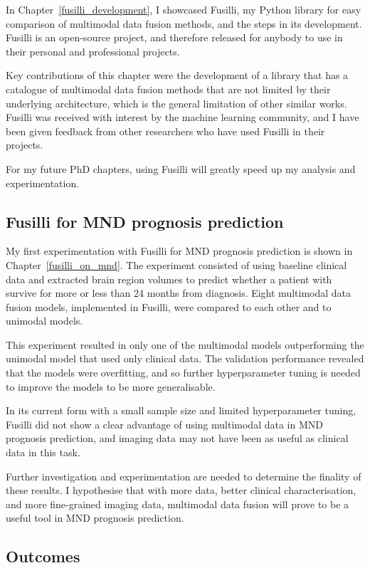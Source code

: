 In Chapter~\ref{fusilli_development}, I showcased Fusilli, my Python library for easy comparison of multimodal data fusion methods, and the steps in its development.
Fusilli is an open-source project, and therefore released for anybody to use in their personal and professional projects.

Key contributions of this chapter were the development of a library that has a catalogue of multimodal data fusion methods that are not limited by their underlying architecture, which is the general limitation of other similar works.
Fusilli was received with interest by the machine learning community, and I have been given feedback from other researchers who have used Fusilli in their projects.

For my future PhD chapters, using Fusilli will greatly speed up my analysis and experimentation.

\subsection{Fusilli for MND prognosis prediction}

My first experimentation with Fusilli for MND prognosis prediction is shown in Chapter~\ref{fusilli_on_mnd}.
The experiment consisted of using baseline clinical data and extracted brain region volumes to predict whether a patient with survive for more or less than 24 months from diagnosis.
Eight multimodal data fusion models, implemented in Fusilli, were compared to each other and to unimodal models.

This experiment resulted in only one of the multimodal models outperforming the unimodal model that used only clinical data.
The validation performance revealed that the models were overfitting, and so further hyperparameter tuning is needed to improve the models to be more generalisable.

In its current form with a small sample size and limited hyperparameter tuning, Fusilli did not show a clear advantage of using multimodal data in MND prognosis prediction, and imaging data may not have been as useful as clinical data in this task.

Further investigation and experimentation are needed to determine the finality of these results.
I hypothesise that with more data, better clinical characterisation, and more fine-grained imaging data, multimodal data fusion will prove to be a useful tool in MND prognosis prediction.

\subsection{Outcomes}

